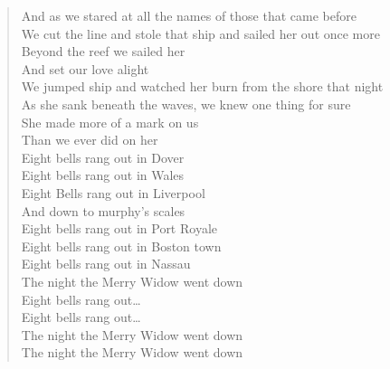\documentclass[11pt]{article}
\begin{document}
\begin{verse}
And as we stared at all the names of those that came before\\
We cut the line and stole that ship and sailed her out once more\\
Beyond the reef we sailed her\\
And set our love alight\\
We jumped ship and watched her burn from the shore that night\\
As she sank beneath the waves, we knew one thing for sure\\
She made more of a mark on us\\
Than we ever did on her\\
Eight bells rang out in Dover\\
Eight bells rang out in Wales\\
Eight Bells rang out in Liverpool\\
And down to murphy's scales\\
Eight bells rang out in Port Royale\\
Eight bells rang out in Boston town\\
Eight bells rang out in Nassau\\
The night the Merry Widow went down\\
\vspace*{1em}
Eight bells rang out…\\
Eight bells rang out…\\
The night the Merry Widow went down\\
The night the Merry Widow went down\\
\end{verse}
\clearpage
\end{document}
